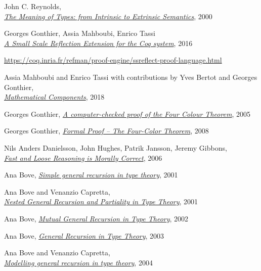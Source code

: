 \documentclass[declaration,mgr,english,shortabstract]{iithesis}
\begin{document}
\begin{thebibliography}{1}
    John C. Reynolds, \\
    \href{https://www.cs.cmu.edu/afs/cs/user/jcr/ftp/typemeaning.pdf}{\textit{The Meaning of Types: from Intrinsic to Extrinsic Semantics}},
    2000

    Georges Gonthier, Assia Mahboubi, Enrico Tassi \\
    \href{https://hal.inria.fr/inria-00258384v17/document}{\textit{A Small Scale Reflection Extension for the Coq system}}, 2016

    \url{https://coq.inria.fr/refman/proof-engine/ssreflect-proof-language.html}
    
    Assia Mahboubi and Enrico Tassi with contributions by Yves Bertot and Georges Gonthier, \\
    \href{https://math-comp.github.io/mcb/}{\textit{Mathematical Components}}, 2018

    Georges Gonthier,
    \href{https://www.cl.cam.ac.uk/~lp15/Pages/4colproof.pdf}{\textit{A computer-checked proof of the Four Colour Theorem}}, 2005

    Georges Gonthier,
    \href{http://www.ams.org/notices/200811/tx081101382p.pdf}{\textit{Formal Proof -- The Four-Color Theorem}}, 2008

    Nils Anders Danielsson, John Hughes, Patrik Jansson, Jeremy Gibbons, \\
    \href{https://www.cs.ox.ac.uk/jeremy.gibbons/publications/fast+loose.pdf}{\textit{Fast and Loose Reasoning is Morally Correct}}, 2006

    Ana Bove,
    \href{https://dl.acm.org/doi/10.5555/774194.774197}{\textit{Simple general recursion in type theory}},
    2001

    Ana Bove and Venanzio Capretta, \\
    \href{https://www.researchgate.net/publication/285777618_Nested_General_Recursion_and_Partiality_in_Type_Theory}{\textit{Nested General Recursion and Partiality in Type Theory}},
    2001

    Ana Bove,
    \href{https://core.ac.uk/display/197949303}{\textit{Mutual General Recursion in Type Theory}},
    2002

    Ana Bove,
    \href{https://link.springer.com/chapter/10.1007/3-540-39185-1_3}{\textit{General Recursion in Type Theory}},
    2003

    Ana Bove and Venanzio Capretta, \\
    \href{http://www.cs.nott.ac.uk/~pszvc/publications/General_Recursion_MSCS_2005.pdf}{\textit{Modelling general recursion in type theory}},
    2004


\end{thebibliography}
\end{document}
